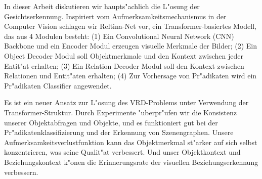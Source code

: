 In dieser Arbeit diskutieren wir haupts"achlich die L"osung der Gesichtserkennung. Inspiriert vom Aufmerksamkeitsmechanismus in der Computer Vision schlagen wir Reltina-Net vor, ein Transformer-basiertes Modell, das aus 4 Modulen besteht: (1) Ein Convolutional Neural Network (CNN) Backbone und ein Encoder Modul erzeugen visuelle Merkmale der Bilder; (2) Ein Object Decoder Modul soll Objektmerkmale und den Kontext zwischen jeder Entit"at erhalten; (3) Ein Relation Decoder Modul soll den Kontext zwischen Relationen und Entit"aten erhalten; (4) Zur Vorhersage von Pr"adikaten wird ein Pr"adikaten Classifier angewendet.

Es ist ein neuer Ansatz zur L"osung des VRD-Problems unter Verwendung der Transformer-Struktur. Durch Experimente "uberpr"ufen wir die Konsistenz unserer Objektabfragen und Objekte, und es funktioniert gut bei der Pr"adikatenklassifizierung und der Erkennung von Szenengraphen. Unsere Aufmerksamkeitsverlustfunktion kann das Objektmerkmal st"arker auf sich selbst konzentrieren, was seine Qualit"at verbessert.  Und unser Objektkontext und Beziehungskontext k"onen die Erinnerungsrate der visuellen Beziehungserkennung verbessern.